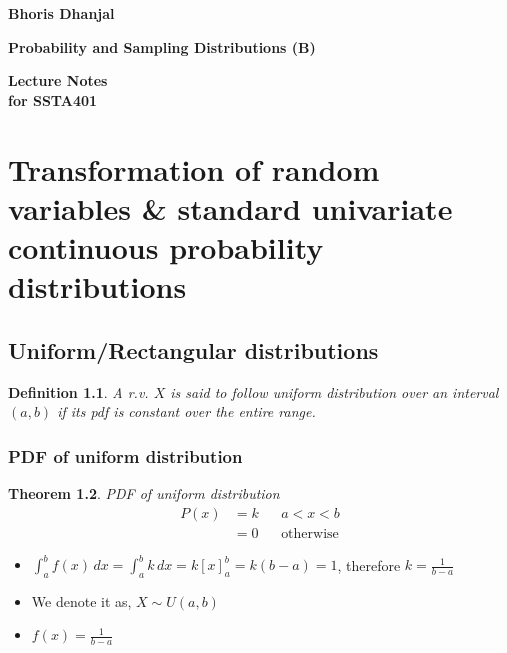 \documentclass[oneside,11pt,pdftex]{book}%
\numberwithin{equation}{section}
\newtheorem{theorem}{Theorem}[chapter]%
\newtheorem{definition}[theorem]{Definition}
\numberwithin{section}{chapter}
\numberwithin{equation}{chapter}
\begin{document}
\frontmatter

\thispagestyle{empty}
\begin{flushright}
{\LARGE \textbf{Bhoris Dhanjal}}%
\end{flushright}
\vfill
\begin{center}
{\fontsize{29.86truept}{0truept}\selectfont \textbf{Probability and Sampling Distributions (B)}}%
\end{center}
\vfill
\begin{flushleft}
{\LARGE \textbf{Lecture Notes}} \\
\hspace{-1.75truept}
{\large \textbf{for SSTA401}}
\end{flushleft}
\newpage

\tableofcontents


\mainmatter

\chapter[Continuous probability distributions]{Transformation of random variables \& standard univariate continuous probability distributions}
\section{Uniform/Rectangular distributions}
\begin{definition}\label{def:uniformdist}
	A r.v. $ X$ is said to follow uniform distribution over an interval $ (a,b) $ if its pdf is constant over the entire range.
\end{definition}
\subsection{PDF of uniform distribution}
\begin{theorem}
	PDF of uniform distribution
	\begin{align*}
		P(x)&=k && a<x<b\\
		&=0 && \text{otherwise}
	\end{align*}
\end{theorem}



\begin{itemize}
	\item $ \int_a^b f(x)\, dx=\int_a^b k\, dx = k[x]_a^b=k(b-a)=1$, therefore $k= \frac{1}{b-a} $
	\item We denote it as, $ X \sim U(a,b) $
	\item $ f(x)=\frac{1}{b-a} $\\ 
\end{itemize}
\end{document}
